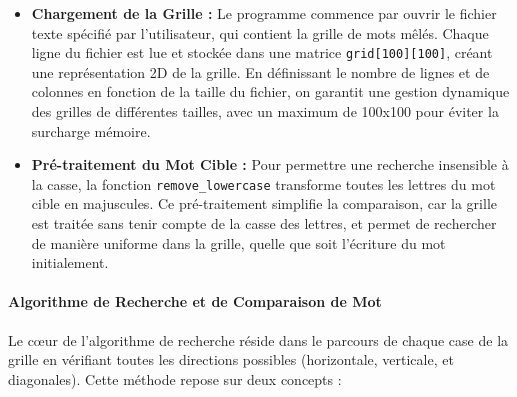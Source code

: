\begin{itemize}
    \item \textbf{Chargement de la Grille :} Le programme commence par ouvrir le fichier texte spécifié par l'utilisateur, qui contient la grille de mots mêlés. Chaque ligne du fichier est lue et stockée dans une matrice \texttt{grid[100][100]}, créant une représentation 2D de la grille. En définissant le nombre de lignes et de colonnes en fonction de la taille du fichier, on garantit une gestion dynamique des grilles de différentes tailles, avec un maximum de 100x100 pour éviter la surcharge mémoire.

    \item \textbf{Pré-traitement du Mot Cible :} Pour permettre une recherche insensible à la casse, la fonction \texttt{remove\_lowercase} transforme toutes les lettres du mot cible en majuscules. Ce pré-traitement simplifie la comparaison, car la grille est traitée sans tenir compte de la casse des lettres, et permet de rechercher de manière uniforme dans la grille, quelle que soit l'écriture du mot initialement.
\end{itemize}

\paragraph{Algorithme de Recherche et de Comparaison de Mot}

Le cœur de l'algorithme de recherche réside dans le parcours de chaque case de la grille en vérifiant toutes les directions possibles (horizontale, verticale, et diagonales). Cette méthode repose sur deux concepts :

